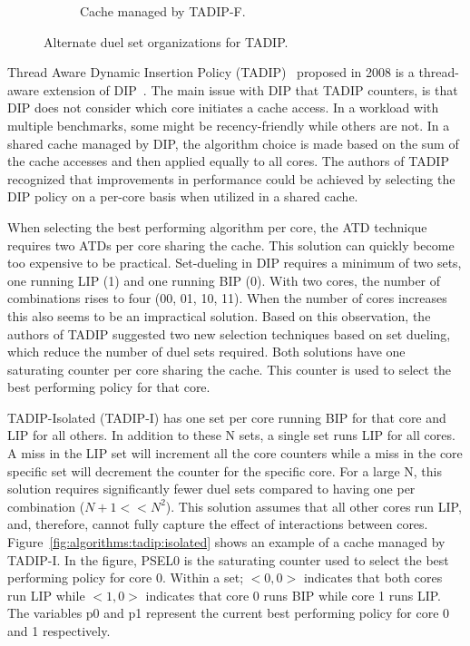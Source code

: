 \begin{figure}[H]
\begin{subfigure}[b]{0.45\textwidth}
        \caption{Cache managed by TADIP-F.}
        \label{fig:algorithms:tadip:feedback}
    \end{subfigure}    
    \caption{Alternate duel set organizations for TADIP.}
    \label{fig:algorithms:tadip}
\end{figure}

Thread Aware Dynamic Insertion Policy (TADIP)~\cite{Jaleel2008} proposed in 2008 is a thread-aware extension of DIP~\cite{Qureshi2007}.
The main issue with DIP that TADIP counters, is that DIP does not consider which core initiates a cache access.
In a workload with multiple benchmarks, some might be recency-friendly while others are not. 
In a shared cache managed by DIP, the algorithm choice is made based on the sum of the cache accesses and then applied equally to all cores.
The authors of TADIP recognized that improvements in performance could be achieved by selecting the DIP policy on a per-core basis when utilized in a shared cache.

When selecting the best performing algorithm per core, the ATD technique requires two ATDs per core sharing the cache. 
This solution can quickly become too expensive to be practical.
Set-dueling in DIP requires a minimum of two sets, one running LIP (1) and one running BIP (0). 
With two cores, the number of combinations rises to four (00, 01, 10, 11).
When the number of cores increases this also seems to be an impractical solution.
Based on this observation, the authors of TADIP suggested two new selection techniques based on set dueling, which reduce the number of duel sets required.
Both solutions have one saturating counter per core sharing the cache.
This counter is used to select the best performing policy for that core.

TADIP-Isolated (TADIP-I) has one set per core running BIP for that core and LIP for all others.
In addition to these N sets, a single set runs LIP for all cores. 
A miss in the LIP set will increment all the core counters while a miss in the core specific set will decrement the counter for the specific core.
For a large N, this solution requires significantly fewer duel sets compared to having one per combination ($N+1 << N^2$). 
This solution assumes that all other cores run LIP, and, therefore, cannot fully capture the effect of interactions between cores.
Figure~\ref{fig:algorithms:tadip:isolated} shows an example of a cache managed by TADIP-I. 
In the figure, PSEL0 is the saturating counter used to select the best performing policy for core 0.
Within a set; $<0, 0>$ indicates that both cores run LIP while $<1, 0>$ indicates that core 0 runs BIP while core 1 runs LIP.
The variables p0 and p1 represent the current best performing policy for core 0 and 1 respectively.

